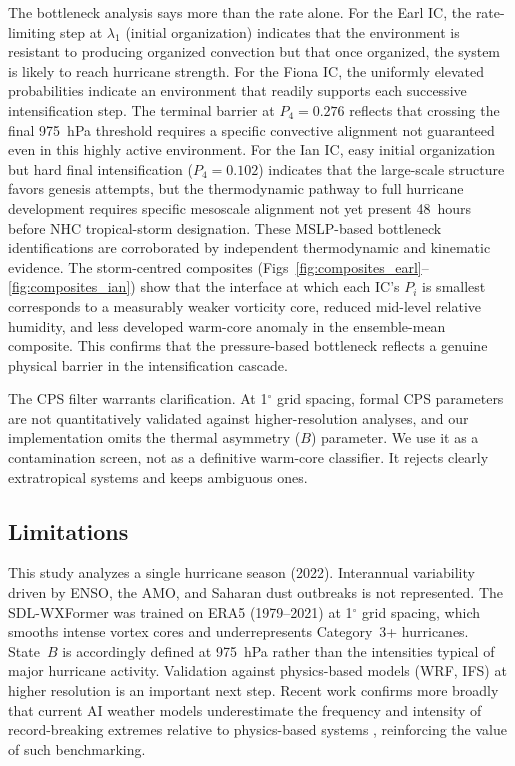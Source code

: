 \documentclass[11pt]{article}
\begin{document}
The bottleneck analysis says more than the rate alone. For the Earl IC,
the rate-limiting step at $\lambda_1$ (initial organization) indicates that the
environment is resistant to producing organized convection but that once organized,
the system is likely to reach hurricane strength. For the Fiona IC, the uniformly elevated probabilities indicate an environment that
readily supports each successive intensification step. The terminal barrier at
$P_4 = 0.276$ reflects that crossing the final 975~hPa threshold requires a specific
convective alignment not guaranteed even in this highly active environment.
For the Ian IC, easy initial organization but hard final intensification ($P_4 = 0.102$)
indicates that the large-scale structure favors genesis attempts, but the thermodynamic
pathway to full hurricane development requires specific mesoscale alignment not yet
present 48~hours before NHC tropical-storm designation.
These MSLP-based bottleneck identifications are corroborated by independent
thermodynamic and kinematic evidence. The storm-centred composites
(Figs~\ref{fig:composites_earl}--\ref{fig:composites_ian}) show that the interface
at which each IC's $P_i$ is smallest corresponds to a measurably weaker vorticity
core, reduced mid-level relative humidity, and less developed warm-core anomaly in
the ensemble-mean composite. This confirms that the pressure-based bottleneck
reflects a genuine physical barrier in the intensification cascade.

The CPS filter warrants clarification. At 1$^\circ$ grid spacing, formal CPS parameters
are not quantitatively validated against higher-resolution analyses, and our implementation
omits the thermal asymmetry ($B$) parameter. We use it as a contamination screen, not
as a definitive warm-core classifier. It rejects clearly extratropical systems and keeps
ambiguous ones.

\subsection{Limitations}

This study analyzes a single hurricane season (2022). Interannual variability driven
by ENSO, the AMO, and Saharan dust outbreaks is not represented. The SDL-WXFormer was
trained on ERA5 (1979--2021) at 1$^\circ$ grid spacing, which smooths intense vortex
cores and underrepresents Category~3+ hurricanes. State~$B$ is accordingly defined at
975~hPa rather than the intensities typical of major hurricane activity. Validation
against physics-based models (WRF, IFS) at higher resolution is an important next step.
Recent work confirms more broadly that current AI weather models underestimate the frequency
and intensity of record-breaking extremes relative to physics-based systems \citep{zhang2026physics},
reinforcing the value of such benchmarking.
\end{document}
